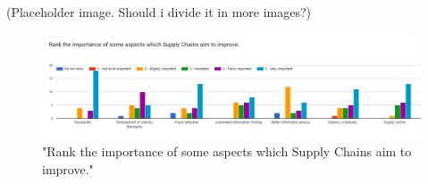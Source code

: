 (Placeholder image. Should i divide it in more images?)

\begin{figure}[h]
\centering
\includegraphics[scale=0.35]{media/importance_SC_improvement_points.png}
\caption["Rank the importance of some aspects which Supply Chains aim to improve."]{"Rank the importance of some aspects which Supply Chains aim to improve."}
\label{fig:importance_SC_improvement_points}
\end{figure}


